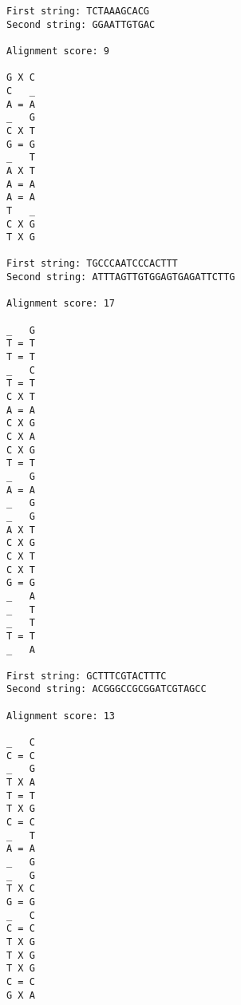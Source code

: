 \documentclass[paper=a4, fontsize=11pt]{scrartcl} %
\numberwithin{equation}{section} %
\numberwithin{figure}{section} %
\numberwithin{table}{section} %
\begin{document}
\begin{enumerate}
\begin{verbatim}
First string: TCTAAAGCACG
Second string: GGAATTGTGAC

Alignment score: 9

G X C
C   _
A = A
_   G
C X T
G = G
_   T
A X T
A = A
A = A
T   _
C X G
T X G

First string: TGCCCAATCCCACTTT
Second string: ATTTAGTTGTGGAGTGAGATTCTTG

Alignment score: 17

_   G
T = T
T = T
_   C
T = T
C X T
A = A
C X G
C X A
C X G
T = T
_   G
A = A
_   G
_   G
A X T
C X G
C X T
C X T
G = G
_   A
_   T
_   T
T = T
_   A

First string: GCTTTCGTACTTTC
Second string: ACGGGCCGCGGATCGTAGCC

Alignment score: 13

_   C
C = C
_   G
T X A
T = T
T X G
C = C
_   T
A = A
_   G
_   G
T X C
G = G
_   C
C = C
T X G
T X G
T X G
C = C
G X A


\end{verbatim}

\end{enumerate}

\end{document}
